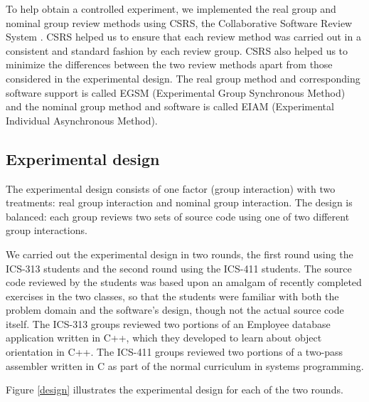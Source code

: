 To help obtain a controlled experiment, we implemented the real group and
nominal group review methods using CSRS, the Collaborative Software Review
System \cite{Johnson94}.  CSRS helped us to ensure that each review method
was carried out in a consistent and standard fashion by each review group.
CSRS also helped us to minimize the differences between the two review
methods apart from those considered in the experimental design. The real
group method and corresponding software support is called EGSM
(Experimental Group Synchronous Method) and the nominal group method and
software is called EIAM (Experimental Individual Asynchronous Method).


\subsection{Experimental design}

The experimental design consists of one factor (group interaction) with two
treatments: real group interaction and nominal group interaction.  The
design is balanced: each group reviews two sets of source code using one of
two different group interactions.

We carried out the experimental design in two rounds, the first round using
the ICS-313 students and the second round using the ICS-411 students. The
source code reviewed by the students was based upon an amalgam of recently
completed exercises in the two classes, so that the students were 
familiar with both the problem domain and the software's design, though not
the actual source code itself. The ICS-313 groups reviewed two portions of
an Employee database application written in C++, which they developed 
to learn about object orientation in C++.  The ICS-411 groups
reviewed two portions of a two-pass assembler written in C as part of the 
normal curriculum in systems programming.

Figure \ref{design} illustrates the experimental design 
for each of the two rounds. 

